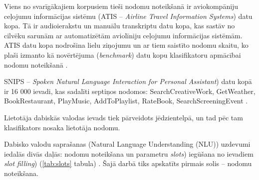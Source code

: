 

Viens no svarīgākajiem korpusiem tieši nodomu noteikšanā ir aviokompāniju ceļojumu informācijas sistēmu (ATIS -- \textit{Airline Travel Information Systems}) datu kopa. Tā ir audioierakstu un manuālu transkriptu datu kopa, kas sastāv no cilvēku sarunām ar automatizētām aviolīniju ceļojumu informācijas sistēmām. ATIS datu kopa nodrošina lielu ziņojumu un ar tiem saistīto nodomu skaitu, ko plaši izmanto kā novērtējuma (\textit{benchmark}) datu kopu klasifikatoru apmācībai nodomu noteikšanā \cite{atis1990}.


SNIPS -- \textit{Spoken Natural Language Interaction for Personal Assistant}) datu kopā ir 16 000 ievadi, kas sadalīti septiņos nodomos: SearchCreativeWork, GetWeather, BookRestaurant, PlayMusic, AddToPlaylist, RateBook, SearchScreeningEvent \cite{snips-2018}.


Lietotāja dabiskās valodas ievads tiek pārveidots jēdzientelpā, un tad pēc tam klasifikators nosaka lietotāja nodomu.

Dabisko valodu saprašanas (Natural Language Understanding (NLU)) uzdevumi iedalās divās daļās: nodomu noteikšana un parametru \textit{slots}) iegūšana no ievadiem \textit{slot filling}) (\ref{tab:slots} tabula) \cite{snips-2018}. Šajā darbā tiks apskatīts pirmais solis -- nodomu noteikšana.


